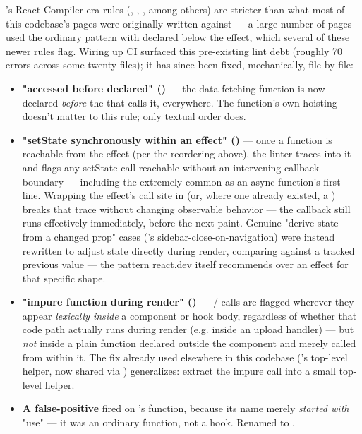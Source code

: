 \begin{olknote}
's React-Compiler-era rules (, , , among others) are stricter than what most of this codebase's pages were originally written against — a large number of pages used the ordinary  pattern with  declared below the effect, which several of these newer rules flag. Wiring up CI surfaced this pre-existing lint debt (roughly 70 errors across some twenty files); it has since been fixed, mechanically, file by file:

\begin{itemize}
  \item \textbf{"accessed before declared" ()} — the data-fetching function is now declared \emph{before} the  that calls it, everywhere. The function's own hoisting doesn't matter to this rule; only textual order does.
  \item \textbf{"setState synchronously within an effect" ()} — once a function is reachable from the effect (per the reordering above), the linter traces into it and flags any setState call reachable without an intervening callback boundary — including the extremely common  as an async function's first line. Wrapping the effect's call site in  (or, where one already existed, a ) breaks that trace without changing observable behavior — the callback still runs effectively immediately, before the next paint. Genuine "derive state from a changed prop" cases ('s sidebar-close-on-navigation) were instead rewritten to adjust state directly during render, comparing against a tracked previous value — the pattern react.dev itself recommends over an effect for that specific shape.
  \item \textbf{"impure function during render" ()} — / calls are flagged wherever they appear \emph{lexically inside} a component or hook body, regardless of whether that code path actually runs during render (e.g. inside an upload handler) — but \emph{not} inside a plain function declared outside the component and merely called from within it. The fix already used elsewhere in this codebase ('s top-level  helper, now shared via ) generalizes: extract the impure call into a small top-level helper.
  \item \textbf{A false-positive } fired on 's  function, because its name merely \emph{started with} "use" — it was an ordinary function, not a hook. Renamed to .
\end{itemize}


\end{olknote}
